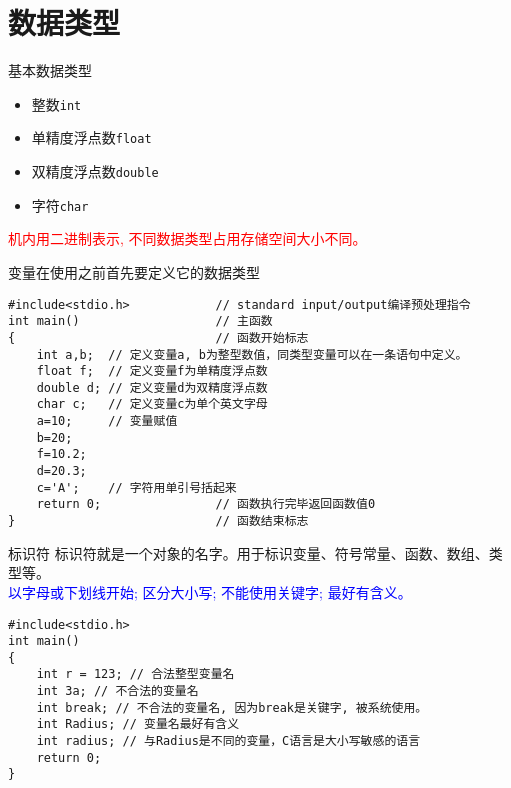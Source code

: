 
\section{数据类型}

\begin{frame}{基本数据类型}
\begin{itemize}
	\item 整数\lstinline|int|
	\item 单精度浮点数\lstinline|float|
	\item 双精度浮点数\lstinline|double|
	\item 字符\lstinline|char|
\end{itemize}
\textcolor{red}{机内用二进制表示, 不同数据类型占用存储空间大小不同。}
\end{frame}

\begin{frame}[fragile]{变量在使用之前首先要定义它的数据类型}
\begin{lstlisting}
#include<stdio.h>            // standard input/output编译预处理指令
int main()                   // 主函数
{                            // 函数开始标志
	int a,b;  // 定义变量a, b为整型数值，同类型变量可以在一条语句中定义。
	float f;  // 定义变量f为单精度浮点数
	double d; // 定义变量d为双精度浮点数
	char c;   // 定义变量c为单个英文字母
	a=10;	  // 变量赋值
	b=20;
	f=10.2;
	d=20.3;
	c='A';	  // 字符用单引号括起来
	return 0;                // 函数执行完毕返回函数值0
}                            // 函数结束标志
\end{lstlisting}
\end{frame}

\begin{frame}[fragile]{标识符}
标识符就是一个对象的名字。用于标识变量、符号常量、函数、数组、类型等。\\
\textcolor{blue}{以字母或下划线开始; 区分大小写; 不能使用关键字; 最好有含义。}
\begin{lstlisting}
#include<stdio.h>           
int main()                   
{                            
	int r = 123; // 合法整型变量名
	int 3a; // 不合法的变量名
	int break; // 不合法的变量名, 因为break是关键字, 被系统使用。
	int Radius; // 变量名最好有含义
	int radius; // 与Radius是不同的变量，C语言是大小写敏感的语言
	return 0;           
}                            
\end{lstlisting}
\end{frame}


